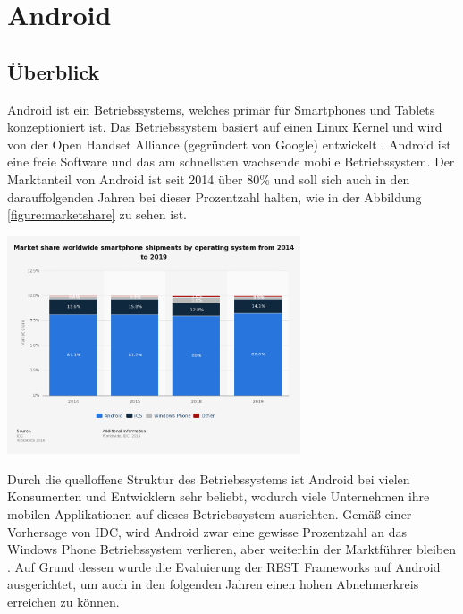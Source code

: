 \chapter{Android}
\label{sec:android}

\section{Überblick}
Android ist ein Betriebssystems, welches primär für Smartphones und Tablets konzeptioniert ist. Das Betriebssystem basiert auf einen Linux Kernel und wird von der Open Handset Alliance (gegründert von Google) entwickelt \cite{overviewAndroid:singh}. Android ist eine freie Software und das am schnellsten wachsende mobile Betriebssystem. Der Marktanteil von Android ist seit 2014 über 80\% und soll sich auch in den darauffolgenden Jahren bei dieser Prozentzahl halten, wie in der Abbildung \ref{figure:marketshare} zu sehen ist. \\
 
\begin{minipage}{\textwidth} 
	\centering	
	\includegraphics[width=0.65\textwidth]{figures/smartphone-os-market-share.png}
	\label{figure:marketshare}
	\vspace{2ex}
\end{minipage}

Durch die quelloffene Struktur des Betriebssystems ist Android bei vielen Konsumenten und Entwicklern sehr beliebt, wodurch viele Unternehmen ihre mobilen Applikationen auf dieses Betriebssystem ausrichten. Gemäß einer Vorhersage von IDC, wird Android zwar eine gewisse Prozentzahl an das Windows Phone Betriebssystem verlieren, aber weiterhin der Marktführer bleiben \cite{statsticMobileOS}. Auf Grund dessen wurde die Evaluierung der REST Frameworks auf Android ausgerichtet, um auch in den folgenden Jahren einen hohen Abnehmerkreis erreichen zu können.

